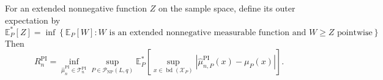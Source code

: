 For an extended nonnegative function \(Z\) on the sample space, define its outer expectation by
\[
 \mathbb E_P^*[Z]
 =\inf\left\{\mathbb E_P[W]:
 W\text{ is an extended nonnegative measurable function and }W\geq Z
 \text{ pointwise}\right\}.
\]
Then
\[
 R_n^{\mathrm{PI}}
 =\inf_{\widehat\mu_n^{\mathrm{PI}}\in\mathcal T_n^{\mathrm{PI}}}
 \sup_{P\in\mathcal P_{\mathrm{NP}}(L,q)}
 \mathbb E_P^*\!\left[
 \sup_{x\in\operatorname{bd}(\mathcal X_P)}
 \left|\widehat\mu_{n,P}^{\mathrm{PI}}(x)-\mu_P(x)\right|
 \right].
\]